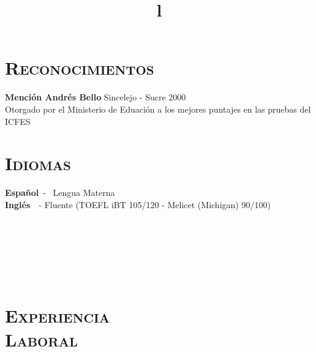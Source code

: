 \begin{resume}

\section{\textsc{Reconocimientos}}
\textbf{Menci\'{o}n Andr\'{e}s Bello} \hfill  Sincelejo - Sucre 2000  \\
Otorgado por el Ministerio de Eduaci\'{o}n a los mejores puntajes en
las pruebas del ICFES \hfill 

\section{\textsc{Idiomas}}
\textbf{Espa\~{n}ol}\   - \  Lengua Materna \\
\textbf{Ingl\'{e}s}\ \  -  Fluente (TOEFL iBT 105/120 - Melicet (Michigan) 90/100)
\begin{formatb}
  \title{l}\\
 \\
  \body\\
\end{formatb}

\section{\textsc{\\Experiencia \\ Laboral}}



\end{resume}
